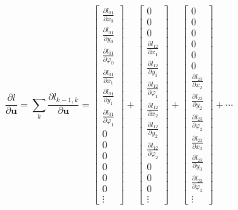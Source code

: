\begin{equation}
\renewcommand\arraystretch{1.5}
\frac{\partial l}{\partial \boldsymbol{u}} = \sum_{k} \frac{\partial l_{k-1,k}}{\partial \boldsymbol{u}} =
\begin{bmatrix}
\frac{\partial l_{01}}{\partial x_{0}} \\
\frac{\partial l_{01}}{\partial y_{0}} \\
\frac{\partial l_{01}}{\partial \varphi_{0}} \\
\frac{\partial l_{01}}{\partial x_{1}} \\
\frac{\partial l_{01}}{\partial y_{1}} \\
\frac{\partial l_{01}}{\partial \varphi_{1}} \\
0 \\
0 \\
0 \\
0 \\
0 \\
0 \\
\vdots
\end{bmatrix}
+
\begin{bmatrix}
0 \\
0 \\
0 \\
\frac{\partial l_{12}}{\partial x_{1}} \\
\frac{\partial l_{12}}{\partial y_{1}} \\
\frac{\partial l_{12}}{\partial \varphi_{1}} \\
\frac{\partial l_{12}}{\partial x_{2}} \\
\frac{\partial l_{12}}{\partial y_{2}} \\
\frac{\partial l_{12}}{\partial \varphi_{2}} \\
0 \\
0 \\
0 \\
\vdots
\end{bmatrix}
+
\begin{bmatrix}
0 \\
0 \\
0 \\
0 \\
0 \\
0 \\
\frac{\partial l_{23}}{\partial x_{2}} \\
\frac{\partial l_{23}}{\partial y_{2}} \\
\frac{\partial l_{23}}{\partial \varphi_{2}} \\
\frac{\partial l_{23}}{\partial x_{3}} \\
\frac{\partial l_{23}}{\partial y_{3}} \\
\frac{\partial l_{23}}{\partial \varphi_{3}} \\
\vdots
\end{bmatrix}
+
\cdots
\end{equation}

